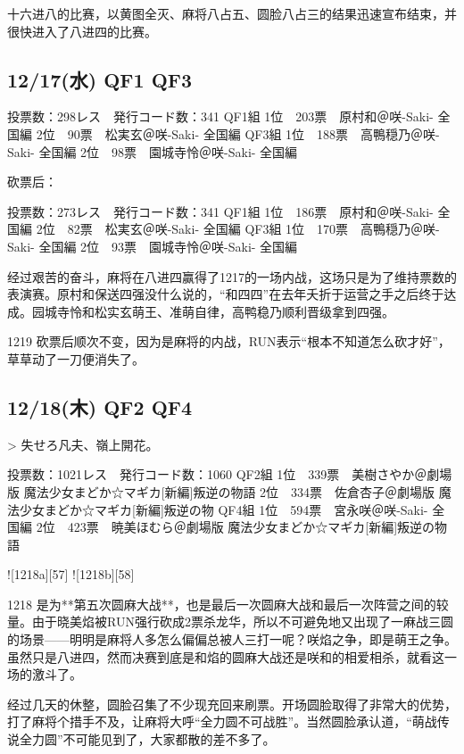 十六进八的比赛，以黄图全灭、麻将八占五、圆脸八占三的结果迅速宣布结束，并很快进入了八进四的比赛。

\subsection{12/17(水) QF1 QF3}

    投票数：298レス　発行コード数：341
    QF1組
    1位　203票　原村和＠咲-Saki- 全国編
    2位　90票　松実玄＠咲-Saki- 全国編
    QF3組
    1位　188票　高鴨穏乃＠咲-Saki- 全国編
    2位　98票　園城寺怜＠咲-Saki- 全国編

砍票后：

    投票数：273レス　発行コード数：341
    QF1組
    1位　186票　原村和＠咲-Saki- 全国編
    2位　82票　松実玄＠咲-Saki- 全国編
    QF3組
    1位　170票　高鴨穏乃＠咲-Saki- 全国編
    2位　93票　園城寺怜＠咲-Saki- 全国編

经过艰苦的奋斗，麻将在八进四赢得了1217的一场内战，这场只是为了维持票数的表演赛。原村和保送四强没什么说的，“和四四”在去年夭折于运营之手之后终于达成。园城寺怜和松实玄萌王、准萌自律，高鸭稳乃顺利晋级拿到四强。

1219 砍票后顺次不变，因为是麻将的内战，RUN表示“根本不知道怎么砍才好”，草草动了一刀便消失了。

\subsection{12/18(木) QF2 QF4}

> 失せろ凡夫、嶺上開花。

    投票数：1021レス　発行コード数：1060
    QF2組
    1位　339票　美樹さやか＠劇場版 魔法少女まどか☆マギカ[新編]叛逆の物語
    2位　334票　佐倉杏子＠劇場版 魔法少女まどか☆マギカ[新編]叛逆の物
    QF4組
    1位　594票　宮永咲＠咲-Saki- 全国編
    2位　423票　暁美ほむら＠劇場版 魔法少女まどか☆マギカ[新編]叛逆の物語

![1218a][57]
![1218b][58]

1218 是为**第五次圆麻大战**，也是最后一次圆麻大战和最后一次阵营之间的较量。由于晓美焰被RUN强行砍成2票杀龙华，所以不可避免地又出现了一麻战三圆的场景——明明是麻将人多怎么偏偏总被人三打一呢？咲焰之争，即是萌王之争。虽然只是八进四，然而决赛到底是和焰的圆麻大战还是咲和的相爱相杀，就看这一场的激斗了。

经过几天的休整，圆脸召集了不少现充回来刷票。开场圆脸取得了非常大的优势，打了麻将个措手不及，让麻将大呼“全力圆不可战胜”。当然圆脸承认道，“萌战传说全力圆”不可能见到了，大家都散的差不多了。

